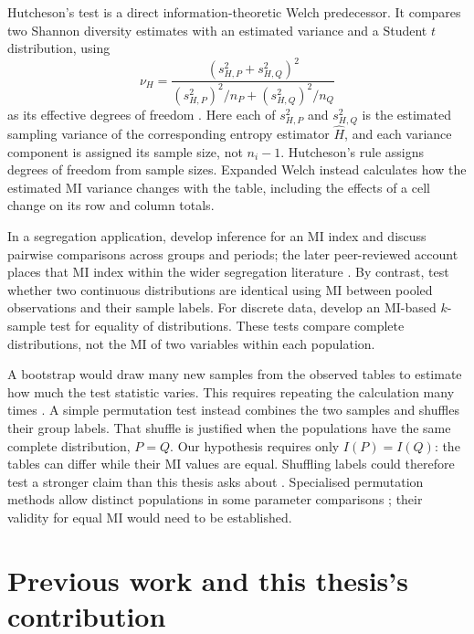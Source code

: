 Hutcheson's test is a direct information-theoretic Welch predecessor. It
compares two Shannon diversity estimates with an estimated variance and a
Student \(t\) distribution, using
\begin{equation}
  \nu_H=
  \frac{(s_{H,P}^2+s_{H,Q}^2)^2}
       {(s_{H,P}^2)^2/n_P+(s_{H,Q}^2)^2/n_Q}
  \label{eq:hutcheson-df}
\end{equation}
as its effective degrees of freedom \citep{hutcheson1970}. Here each of
\(s_{H,P}^2\) and \(s_{H,Q}^2\) is the estimated sampling variance of the
corresponding entropy estimator \(\widehat H\), and each variance component
is assigned its sample size, not \(n_i-1\).
Hutcheson's rule assigns degrees of freedom from sample sizes. Expanded
Welch instead calculates how the estimated MI variance changes with the
table, including the effects of a cell change on its row and column totals.

In a segregation application, \citet{mora2009} develop inference for an MI index and discuss
pairwise comparisons across groups and periods; the later peer-reviewed account
places that MI index within the wider segregation literature \citep{mora2011}.
By contrast, \citet{guha2014} test whether two continuous distributions are identical
using MI between pooled observations and their sample labels.
For discrete data, \citet{drake2014} develop an MI-based \(k\)-sample test
for equality of distributions. These tests compare complete distributions,
not the MI of two variables within each population.

\medskip
{}

A bootstrap would draw many new samples from the observed tables to estimate
how much the test statistic varies. This requires repeating the calculation
many times \citep{efron1979}. A simple permutation test instead combines the
two samples and shuffles their group labels. That shuffle is justified when
the populations have the same complete distribution, \(P=Q\). Our hypothesis
requires only \(I(P)=I(Q)\): the tables can differ while their MI values are
equal. Shuffling labels could therefore test a stronger claim than this thesis
asks about \citep{chung2013}. Specialised permutation methods allow distinct
populations in some parameter comparisons \citep{janssen1997,chung2013};
their validity for equal MI would need to be established.

\section{Previous work and this thesis's contribution}

